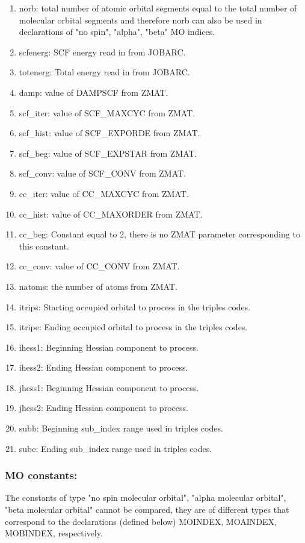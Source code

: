 \documentclass[12pt]{article}
\begin{document}
\begin{enumerate}
\item norb: total number of atomic orbital segments equal to the total number of 
molecular orbital segments and therefore norb can also be used in declarations of 
"no spin", "alpha", "beta" MO indices.
\item scfenerg: SCF energy read in from JOBARC.
\item totenerg: Total energy read in from JOBARC.
\item damp: value of DAMPSCF from ZMAT.
\item scf\_iter: value of SCF\_MAXCYC from ZMAT.
\item scf\_hist: value of SCF\_EXPORDE from ZMAT.
\item scf\_beg: value of SCF\_EXPSTAR from ZMAT.
\item scf\_conv: value of SCF\_CONV from ZMAT.
\item cc\_iter: value of CC\_MAXCYC from ZMAT.
\item cc\_hist: value of CC\_MAXORDER from ZMAT.
\item cc\_beg: Constant equal to 2, there is no ZMAT parameter corresponding to 
          this constant.
\item cc\_conv: value of CC\_CONV from ZMAT.
\item natoms: the number of atoms from ZMAT.
\item itrips: Starting occupied orbital to process in the triples codes.
\item itripe: Ending occupied orbital to process in the triples codes.
\item ihess1: Beginning Hessian component to process.
\item ihess2: Ending Hessian component to process.
\item jhess1: Beginning Hessian component to process.
\item jhess2: Ending Hessian component to process.
\item subb: Beginning sub\_index range used in triples codes.
\item sube: Ending sub\_index range used in triples codes.
\end{enumerate}

\subsubsection{MO constants:} The constants of type "no spin molecular orbital", "alpha 
molecular orbital", "beta molecular orbital" cannot be compared, they are of 
different types that correspond to the declarations (defined below) MOINDEX, 
MOAINDEX, MOBINDEX, respectively.
\end{document}

